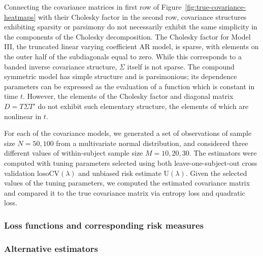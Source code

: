 \documentclass[12pt]{article}
\theoremstyle{definition}
\begin{document}
\bigskip



\bigskip

Connecting the covariance matrices in first row of Figure~\ref{fig:true-covariance-heatmaps} with their Cholesky factor in the second row, covariance structures exhibiting sparsity or parsimony do not necessarily exhibit the same simplicity in the components of the Cholesky decomposition. The Cholesky factor for Model III, the truncated linear varying coefficient AR model, is sparse, with elements on the outer half of the subdiagonals equal to zero. While this corresponds to a banded inverse covariance structure, $\Sigma$ itself is not sparse.  The compound symmetric model has simple structure and is parsimonious; its dependence parameters can be expressed as the evaluation of a function which is constant in time $t$. However, the elements of the Cholesky factor and diagonal matrix $D = T \Sigma T'$ do not exhibit such elementary structure, the elements of which are nonlinear in $t$. 

\bigskip


\bigskip

For each of the covariance models, we generated a set of observations of sample size $N = 50, 100$ from a multivariate normal distribution, and considered three different values of within-subject sample size $M = 10, 20, 30$. The estimators were computed with tuning parameters selected using both leave-one-subject-out cross validation $\mbox{losoCV}\left(\lambda\right)$ and unbiased risk estimate $\mbox{U}\left(\lambda\right)$. Given the selected values of the tuning parameters, we computed the estimated covariance matrix and compared it to the true covariance matrix via entropy loss and quadratic loss. 

\bigskip
\subsubsection{Loss functions and corresponding risk measures}


\bigskip

\subsubsection{Alternative estimators}

\end{document}
